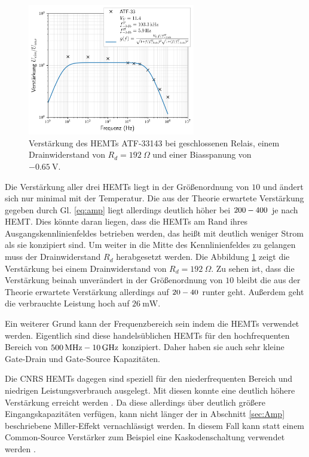 \begin{figure}[!b]
\begin{center}
\includegraphics[width=0.65\textwidth]{./fig/Gain/G33WarmMarch21.png}
\vspace{-0.5cm}
\caption{Verstärkung des HEMTs ATF-33143 bei geschlossenen Relais, einem Drainwiderstand von $R_d = \SI{192}{\Omega}$ und einer Biasspanung von $\SI{-0.65}{\volt}$.}
\label{fig:33WarmGain100}
\end{center}
\end{figure}

Die Verstärkung aller drei HEMTs liegt in der Größenordnung von $10$ und ändert sich nur minimal mit der Temperatur.
Die aus der Theorie erwartete Verstärkung gegeben durch Gl. \eqref{eq:amp} liegt allerdings deutlich höher bei $200\-- 400$ je nach HEMT.
Dies könnte daran liegen, dass die HEMTs am Rand ihres Ausgangskennlinienfeldes betrieben werden, das heißt mit deutlich weniger Strom als sie konzipiert sind.
Um weiter in die Mitte des Kennlinienfeldes zu gelangen muss der Drainwiderstand $R_d$ herabgesetzt werden.
Die Abbildung \ref{fig:33WarmGain100} zeigt die Verstärkung bei einem Drainwiderstand von $R_d=\SI{192}{\Omega}$.
Zu sehen ist, dass die Verstärkung beinah unverändert in der Größenordnung von $10$ bleibt die aus der Theorie erwartete Verstärkung allerdings auf $20 \-- 40$ runter geht.
Außerdem geht die verbrauchte Leistung hoch auf $\SI{26}{\milli\watt}$.

Ein weiterer Grund kann der Frequenzbereich sein indem die HEMTs verwendet werden.
Eigentlich sind diese handelsüblichen HEMTs für den hochfrequenten Bereich von $\SI{500}{\mega\hertz}\--\SI{10}{\giga\hertz}$ konzipiert.
Daher haben sie auch sehr kleine Gate-Drain und Gate-Source Kapazitäten.

Die CNRS HEMTs dagegen sind speziell für den niederfrequenten Bereich und niedrigen Leistungsverbrauch ausgelegt.
Mit diesen konnte eine deutlich höhere Verstärkung erreicht werden \cite{Phipps:2016mwv}.
Da diese allerdings über deutlich größere Eingangskapazitäten verfügen, kann nicht länger der in Abschnitt \ref{sec:Amp} beschriebene Miller-Effekt vernachlässigt werden.
In diesem Fall kann statt einem Common-Source Verstärker zum Beispiel eine Kaskodenschaltung verwendet werden \cite{Gray}.

